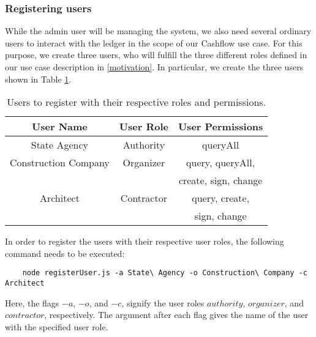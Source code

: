 \subsubsection{Registering users} \label{registering-users} %
While the admin user will be managing the system, we also need several ordinary users to interact with the ledger in the scope of our Cashflow use case. 
For this purpose, we create three users, who will fulfill the three different roles defined in our use case description in \ref{motivation}. In particular, we create the three users shown in Table \ref{tbl:users}.  
\begin{table}[ht]
	\begin{center}
		\addtolength{\tabcolsep}{-2pt} %
		\noindent\begin{tabular}{|c|c|c|} %
			\hline 
			\textbf{User Name} & \textbf{User Role} & \textbf{User Permissions} \\ 
			\hline 
			State Agency & Authority & queryAll \\ 
			\hline 
			Construction Company & Organizer & query, queryAll, \\ & & create, sign, change \\ 
			\hline 
			Architect & Contractor & query, create, \\ & & sign, change \\ 
			\hline 
		\end{tabular} 
	\end{center}
	\caption{Users to register with their respective roles and permissions. }
	\label{tbl:users}
	\vspace{-6mm} %
\end{table}
In order to register the users with their respective user roles, the following command needs to be executed: 
\begin{verbatim}
	node registerUser.js -a State\ Agency -o Construction\ Company -c Architect
\end{verbatim}
Here, the flags $ -a $, $ -o $, and $ -c $, signify the user roles $ authority $, $ organizer $, and $ contractor $, respectively. The argument after each flag gives the name of the user with the specified user role. 

